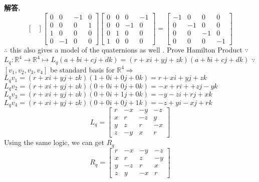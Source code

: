 \documentclass[12pt, a4paper, oneside]{article}
\newenvironment{solution}{\par\noindent\textbf{解答. }}{\par}
\begin{document}
\begin{CJK}{UTF8}{gbsn}
\begin{solution}
$$\begin{bmatrix}
  \end{bmatrix} \begin{bmatrix}
    0 & 0 & -1 & 0 \\ 0 & 0 & 0 & 1 \\ 1 & 0 & 0 & 0 \\ 0 & -1 & 0 & 0 
  \end{bmatrix} \begin{bmatrix}
    0 & 0 & 0 & -1 \\  0 & 0 & -1 & 0 \\ 0 & 1 & 0 & 0 \\ 1 & 0 & 0 & 0
  \end{bmatrix} =  \begin{bmatrix}
    -1 & 0 & 0 & 0 \\ 0 & -1 & 0 & 0 \\ 0 & 0 & -1 & 0 \\ 0 & 0 & 0 & -1
  \end{bmatrix}
  $$
  $\therefore$ this also gives a model of the quaternions as well . Prove Hamilton Product \newline
  $\because$ $L_q: \mathbb{R}^4 \rightarrow \mathbb{R}^4 \mapsto L_q(a + bi + cj + dk) = (r + xi +yj + zk)(a + bi + cj + dk)$  \newline
  $\because$ $[v_1, v_2, v_3, v_4]$ be standard basis for $\mathbb{R}^4 \Rightarrow$ \newline
  $L_q v_1 = (r + xi + yj + zk)(1 + 0i + 0j + 0k) = r + xi + yj + zk$ \newline
  $L_q v_2 = (r + xi + yj + zk)(0 + 0i + 0j + 0k) = -x + ri + + zj - yk$ \newline
  $L_q v_3 = (r + xi + yj + zk)(0 + 0i + 1j + 0k) = -y - zi + rj + xk$ \newline
  $L_q v_4 = (r + xi + yj + zk)(0 + 0i + 0j + 1k) = -z + yi - xj + rk$ \newline
  $$ L_q = \begin{bmatrix}
    r & -x & -y & -z \\ 
    x & r & -z & y \\
    y & z & r & -x \\
    z & -y & x & r
  \end{bmatrix}
  $$
  Using the same logic, we can get $R_q$
  $$ R_q = \begin{bmatrix}
    r & -x & -y & -z \\
    x & r & z & -y \\ 
    y & -z & r & x \\ 
    z & y & -x & r

\end{bmatrix}$$
\end{solution}
\end{CJK}
\end{document}
